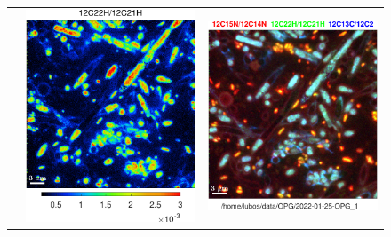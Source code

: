 \begin{figure}[!h]
\begin{tabular}{ccc}
&
\includegraphics[scale=\scf, valign=t]{figs8/12C22H-12C21H}
&
\includegraphics[scale=\scf, valign=t]{figs8/12C15N-12C14N-vs-12C22H-12C21H-vs-12C13C-12C2-rgb}

\end{tabular}
\end{figure}
